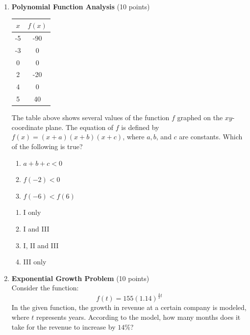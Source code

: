 \begin{enumerate}
  \newpage

  \item \textbf{Polynomial Function Analysis} (10 points)\\
  \begin{table}[h!]
  \centering
  \renewcommand{\arraystretch}{1.3}
  \setlength{\tabcolsep}{16pt}
  \begin{tabular}{|c|c|}
  \hline
  \rowcolor[HTML]{E0E0E0}
  $x$ & $f(x)$ \\
  \hline
  -5 & -90 \\
  \hline
  -3 & 0 \\
  \hline
  0 & 0 \\
  \hline
  2 & -20 \\
  \hline
  4 & 0 \\
  \hline
  5 & 40 \\
  \hline
  \end{tabular}
  \end{table}
  The table above shows several values of the function $f$ graphed on the $xy$-coordinate plane. The equation of $f$ is defined by $f(x)=(x+a)(x+b)(x+c)$, where $a, b$, and $c$ are constants. Which of the following is true?
  \begin{enumerate}[label=(\Roman*)]
    \item $a+b+c<0$
    \item $f(-2)<0$
    \item $f(-6)<f(6)$
  \end{enumerate}
  \begin{enumerate}[label=(\Alph*)]
    \item I only
    \item I and III
    \item I, II and III
    \item III only
  \end{enumerate}
  \begin{subanswer}
  \end{subanswer}

  
  \item \textbf{Exponential Growth Problem} (10 points)\\
  Consider the function:
  \[
    f(t)=155(1.14)^{\frac{4}{3} t}
  \]
  In the given function, the growth in revenue at a certain company is modeled, where $t$ represents years. According to the model, how many months does it take for the revenue to increase by $14\%$?
  \begin{subanswer}
  \end{subanswer}




\end{enumerate}
